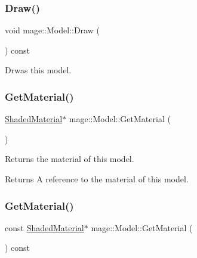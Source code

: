 \subsubsection{\texorpdfstring{Draw()}{Draw()}}
{\footnotesize\ttfamily void mage\+::\+Model\+::\+Draw (\begin{DoxyParamCaption}{ }\end{DoxyParamCaption}) const}

Drwas this model. \hypertarget{classmage_1_1_model_aed33390bd172e034a76fa68093990174}{}\label{classmage_1_1_model_aed33390bd172e034a76fa68093990174} 
\subsubsection{\texorpdfstring{Get\+Material()}{GetMaterial()}\hspace{0.1cm}{\footnotesize\ttfamily [1/2]}}
{\footnotesize\ttfamily \hyperlink{structmage_1_1_shaded_material}{Shaded\+Material}$\ast$ mage\+::\+Model\+::\+Get\+Material (\begin{DoxyParamCaption}{ }\end{DoxyParamCaption})\hspace{0.3cm}{\ttfamily [noexcept]}}

Returns the material of this model.

\begin{DoxyReturn}{Returns}
A reference to the material of this model. 
\end{DoxyReturn}
\hypertarget{classmage_1_1_model_aa6ba2f2fbcb5aae6c1112f120e5d146c}{}\label{classmage_1_1_model_aa6ba2f2fbcb5aae6c1112f120e5d146c} 
\subsubsection{\texorpdfstring{Get\+Material()}{GetMaterial()}\hspace{0.1cm}{\footnotesize\ttfamily [2/2]}}
{\footnotesize\ttfamily const \hyperlink{structmage_1_1_shaded_material}{Shaded\+Material}$\ast$ mage\+::\+Model\+::\+Get\+Material (\begin{DoxyParamCaption}{ }\end{DoxyParamCaption}) const\hspace{0.3cm}{\ttfamily [noexcept]}}

